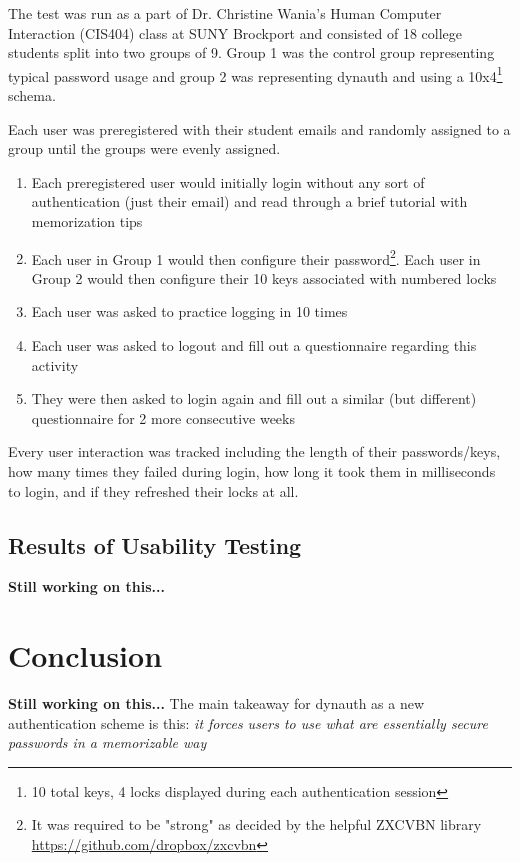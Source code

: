 \documentclass[conference]{IEEEtran}
\begin{document}
		The test was run as a part of Dr. Christine Wania's Human Computer Interaction (CIS404) class at SUNY Brockport and consisted of 18 college students split into two groups of 9. Group 1 was the control group representing typical password usage and group 2 was representing dynauth and using a 10x4\footnote{10 total keys, 4 locks displayed during each authentication session} schema.
	
		Each user was preregistered with their student emails and randomly assigned to a group until the groups were evenly assigned.
		\begin{enumerate}
			\item Each preregistered user would initially login without any sort of authentication (just their email) and read through a brief tutorial with memorization tips
			\item Each user in Group 1 would then configure their password\footnote{It was required to be "strong" as decided by the helpful ZXCVBN library \url{https://github.com/dropbox/zxcvbn}}. Each user in Group 2 would then configure their 10 keys associated with numbered locks
			\item Each user was asked to practice logging in 10 times
			\item Each user was asked to logout and fill out a questionnaire regarding this activity
			\item They were then asked to login again and fill out a similar (but different) questionnaire for 2 more consecutive weeks
		\end{enumerate}
		Every user interaction was tracked including the length of their passwords/keys, how many times they failed during login, how long it took them in milliseconds to login, and if they refreshed their locks at all.
	\subsection{Results of Usability Testing}
		\textbf{Still working on this...}

\section{Conclusion}
	\textbf{Still working on this...}
	The main takeaway for dynauth as a new authentication scheme is this: \textit{it forces users to use what are essentially secure passwords in a memorizable way}
\end{document}
